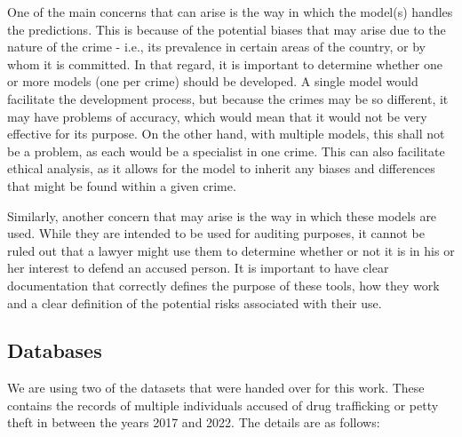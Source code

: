 \documentclass[twoside,11pt]{article}
\begin{document}
One of the main concerns that can arise is the way in which the model(s) handles the predictions. This is because of the potential biases that may arise due to the nature of the crime - i.e., its prevalence in certain areas of the country, or by whom it is committed. In that regard, it is important to determine whether one or more models (one per crime) should be developed. A single model would facilitate the development process, but because the crimes may be so different, it may have problems of accuracy, which would mean that it would not be very effective for its purpose. On the other hand, with multiple models, this shall not be a problem, as each would be a specialist in one crime. This can also facilitate ethical analysis, as it allows for the model to inherit any biases and differences that might be found within a given crime.

Similarly, another concern that may arise is the way in which these models are used. While they are intended to be used for auditing purposes, it cannot be ruled out that a lawyer might use them to determine whether or not it is in his or her interest to defend an accused person. It is important to have clear documentation that correctly defines the purpose of these tools, how they work and a clear definition of the potential risks associated with their use.

\subsection{Databases}\label{subsec:Databases}

We are using two of the datasets that were handed over for this work. These contains the records of multiple individuals accused of drug trafficking or petty theft in between the years 2017 and 2022. The details are as follows:
\end{document}
